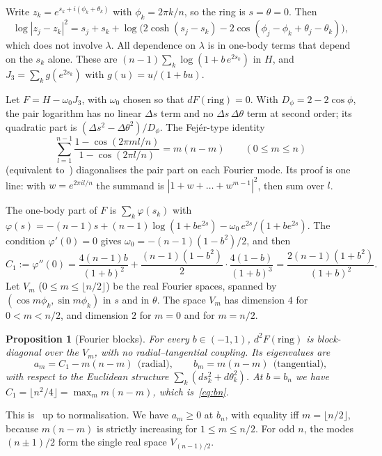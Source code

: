 \documentclass[11pt]{article}
\newtheorem{proposition}[theorem]{Proposition}
\theoremstyle{definition}
\theoremstyle{remark}
\newcommand{\floor}[1]{\lfloor #1\rfloor}
\begin{document}
Write $z_k=e^{s_k+i(\phi_k+\theta_k)}$ with $\phi_k=2\pi k/n$, so the ring is $s=\theta=0$. Then
\[
\log|z_j-z_k|^2=s_j+s_k+\log\big(2\cosh(s_j-s_k)-2\cos(\phi_j-\phi_k+\theta_j-\theta_k)\big),
\]
which does not involve $\lambda$. All dependence on $\lambda$ is in one-body terms that depend on the
$s_k$ alone. These are $(n-1)\sum_k\log(1+b\,e^{2s_k})$ in $H$, and
$J_3=\sum_k g(e^{2s_k})$ with $g(u)=u/(1+bu)$.

Let $F=H-\omega_0J_3$, with $\omega_0$ chosen so that $dF(\text{ring})=0$. With
$D_\phi=2-2\cos\phi$, the pair logarithm has no linear $\Delta s$ term and no
$\Delta s\,\Delta\theta$ term at second order; its quadratic part is $(\Delta s^2-\Delta\theta^2)/D_\phi$.
The Fej\'er-type identity
\begin{equation}\label{eq:fejer}
\sum_{l=1}^{n-1}\frac{1-\cos(2\pi ml/n)}{1-\cos(2\pi l/n)}=m(n-m)\qquad(0\le m\le n)
\end{equation}
(equivalent to~\cite[(2.4)]{MT}) diagonalises the pair part on each Fourier mode. Its proof is one line:
with $w=e^{2\pi il/n}$ the summand is $|1+w+\dots+w^{m-1}|^2$, then sum over $l$.

The one-body part of $F$ is $\sum_k\varphi(s_k)$ with
$\varphi(s)=-(n-1)s+(n-1)\log(1+be^{2s})-\omega_0\,e^{2s}/(1+be^{2s})$. The condition $\varphi'(0)=0$ gives
$\omega_0=-(n-1)(1-b^2)/2$, and then
\[
C_1:=\varphi''(0)=\frac{4(n-1)b}{(1+b)^2}+\frac{(n-1)(1-b^2)}2\cdot\frac{4(1-b)}{(1+b)^3}
=\frac{2(n-1)(1+b^2)}{(1+b)^2}.
\]
Let $V_m$ ($0\le m\le\floor{n/2}$) be the real Fourier spaces, spanned by
$(\cos m\phi_k,\sin m\phi_k)$ in $s$ and in $\theta$. The space $V_m$ has dimension $4$ for
$0<m<n/2$, and dimension $2$ for $m=0$ and for $m=n/2$.

\begin{proposition}[Fourier blocks]\label{prop:blocks}
For every $b\in(-1,1)$, $d^2F(\text{ring})$ is block-diagonal over the $V_m$, with no radial--tangential
coupling. Its eigenvalues are
\[
a_m=C_1-m(n-m)\ \ \text{(radial)},\qquad b_m=m(n-m)\ \ \text{(tangential)},
\]
with respect to the Euclidean structure $\sum_k(ds_k^2+d\theta_k^2)$. At $b=b_n$ we have
$C_1=\floor{n^2/4}=\max_m m(n-m)$, which is~\eqref{eq:bn}.
\end{proposition}

\noindent
This is~\cite[(2.6)]{MT} up to normalisation. We have $a_m\ge0$ at $b_n$, with equality iff
$m=\floor{n/2}$, because $m(n-m)$ is strictly increasing for $1\le m\le n/2$. For odd $n$, the modes
$(n\pm1)/2$ form the single real space $V_{(n-1)/2}$.
\end{document}
